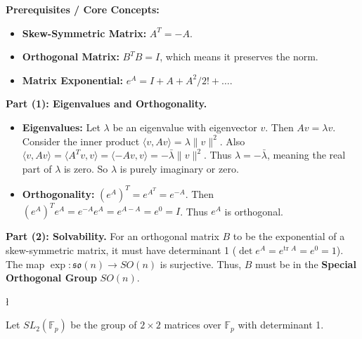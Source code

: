 \begin{solution}
\textbf{Prerequisites / Core Concepts:}
\begin{itemize}
    \item \textbf{Skew-Symmetric Matrix:} $A^T = -A$.
    \item \textbf{Orthogonal Matrix:} $B^T B = I$, which means it preserves the norm.
    \item \textbf{Matrix Exponential:} $e^A = I + A + A^2/2! + \dots$.
\end{itemize}

\textbf{Part (1): Eigenvalues and Orthogonality.}
\begin{itemize}
    \item \textbf{Eigenvalues:} Let $\lambda$ be an eigenvalue with eigenvector $v$. Then $Av = \lambda v$.
      Consider the inner product $\langle v, Av \rangle = \lambda \|v\|^2$.
      Also $\langle v, Av \rangle = \langle A^T v, v \rangle = \langle -Av, v \rangle = -\bar{\lambda} \|v\|^2$.
      Thus $\lambda = -\bar{\lambda}$, meaning the real part of $\lambda$ is zero. So $\lambda$ is purely imaginary or zero.
    \item \textbf{Orthogonality:} $(e^A)^T = e^{A^T} = e^{-A}$.
      Then $(e^A)^T e^A = e^{-A} e^A = e^{A-A} = e^0 = I$. Thus $e^A$ is orthogonal.
\end{itemize}

\textbf{Part (2): Solvability.}
For an orthogonal matrix $B$ to be the exponential of a skew-symmetric matrix, it must have determinant 1 ($\det e^A = e^{\text{tr } A} = e^0 = 1$). 
The map $\exp: \mathfrak{so}(n) \to SO(n)$ is surjective.
Thus, $B$ must be in the \textbf{Special Orthogonal Group} $SO(n)$.
\end{solution}

\begin{exercise}
\l\label{2013:6}

\label{algebra:2013:6}Let $SL_2(\mathbb{F}_p)$ be the group of $2 \times 2$ matrices over $\mathbb{F}_p$ with determinant 1.
\end{exercise}


